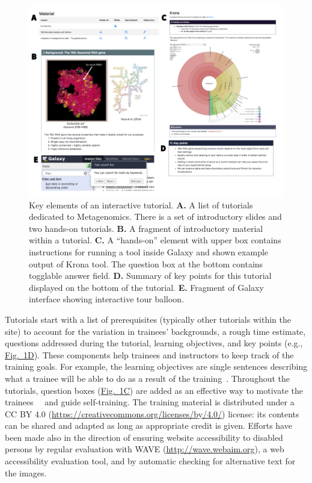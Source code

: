 \begin{figure}[t!]
    \centering
    \includegraphics[width=\textwidth]{chapters/images/training/training-figure-metagenomics.png}
    \caption{Key elements of an interactive tutorial. \textbf{A.} A list of tutorials dedicated to Metagenomics. There is a set of introductory slides and two hands-on tutorials. \textbf{B.} A fragment of introductory material within a tutorial. \textbf{C.} A “hands-on” element with upper box contains instructions for running a tool inside Galaxy and shown example output of Krona tool. The question box at the bottom contains togglable answer field. \textbf{D.} Summary of key points for this tutorial displayed on the bottom of the tutorial. \textbf{E.} Fragment of Galaxy interface showing interactive tour balloon.  }
    \label{fig:metagenomics}
\end{figure}

Tutorials start with a list of prerequisites (typically other tutorials within the site) to account for the variation in trainees’ backgrounds, a rough time estimate, questions addressed during the tutorial, learning objectives, and key points (e.g., \hyperref[fig:metagenomics]{Fig.~\ref{fig:metagenomics}D}). These components help trainees and instructors to keep track of the training goals. For example, the learning objectives are single sentences describing what a trainee will be able to do as a result of the training~\cite{via2013best}. Throughout the tutorials, question boxes (\hyperref[fig:metagenomics]{Fig.~\ref{fig:metagenomics}C}) are added as an effective way to motivate the trainees~\cite{dollar2007enhancing}~\cite{scheines2005replacing} and guide self-training. The training material is distributed under a CC BY 4.0 (\url{https://creativecommons.org/licenses/by/4.0/}) license: its contents can be shared and adapted as long as appropriate credit is given. Efforts have been made also in the direction of ensuring website accessibility to disabled persons by regular evaluation with WAVE (\url{http://wave.webaim.org}), a web accessibility evaluation tool, and by automatic checking for alternative text for the images.

